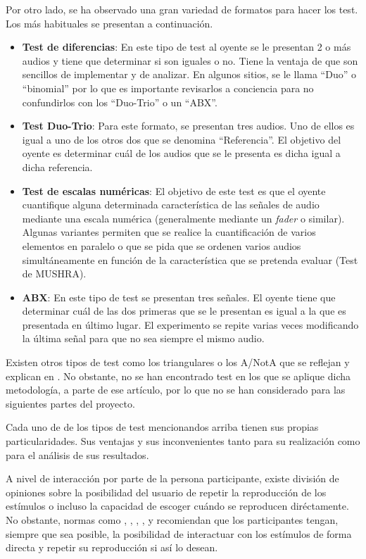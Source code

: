 \documentclass[11pt,a4paper]{book}
\begin{document}
    Por otro lado, se ha observado una gran variedad de formatos para hacer los test. Los más habituales se presentan a continuación.
    
    \begin{itemize}
        \item \textbf{Test de diferencias}: En este tipo de test al oyente se le presentan 2 o más audios y tiene que determinar si son iguales o no. Tiene la ventaja de que son sencillos de implementar y de analizar. En algunos sitios, se le llama ``Duo'' o ``binomial'' por lo que es importante revisarlos a conciencia para no confundirlos con los ``Duo-Trio'' o un ``ABX''.
        \item \textbf{Test Duo-Trio}: Para este formato, se presentan tres audios. Uno de ellos es igual a  uno de los otros dos que se denomina ``Referencia''. El objetivo del oyente es determinar cuál de los audios que se le presenta es dicha igual a dicha referencia.
        \item \textbf{Test de escalas numéricas}: El objetivo de este test es que el oyente cuantifique alguna determinada característica de las señales de audio mediante una escala numérica (generalmente mediante un \textit{fader} o similar). Algunas variantes permiten que se realice la cuantificación de varios elementos en paralelo o que se pida que se ordenen varios audios simultáneamente en función de la característica que se pretenda evaluar (Test de MUSHRA).
        \item \textbf{ABX}: En este tipo de test se presentan tres señales. El oyente tiene que determinar cuál de las dos primeras que se le presentan es igual a la que es presentada en último lugar. El experimento se repite varias veces modificando la última señal para que no sea siempre el mismo audio. 
    \end{itemize}
    Existen otros tipos de test como los triangulares o los A/NotA que se reflejan y explican en \cite{delaPrida2021}. No obstante, no se han encontrado test en los que se aplique dicha metodología, a parte de ese artículo, por lo que no se han considerado para las siguientes partes del proyecto.
    
    Cada uno de de los tipos de test mencionandos arriba tienen sus propias particularidades. Sus ventajas y sus inconvenientes tanto para su realización como para el análisis de sus resultados.
    
    A nivel de interacción por parte de la persona participante, existe división de opiniones sobre la posibilidad del usuario de repetir la reproducción de los estímulos o incluso la capacidad de escoger cuándo se reproducen diréctamente. No obstante, normas como \cite{UIT1116}, \cite{UIT1534}, \cite{UIT1284}, \cite{EBU3286}, \cite{UIT1285} y \cite{UIT1286} recomiendan que los participantes tengan, siempre que sea posible, la posibilidad de interactuar con los estímulos de forma directa y repetir su reproducción si así lo desean.
    
\end{document}
